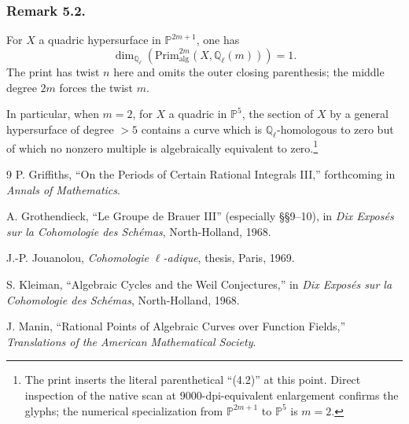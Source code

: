 \subsubsection*{Remark 5.2.}
For $X$ a quadric hypersurface in $\mathbb P^{2m+1}$, one has
\begin{equation*}
\dim_{\mathbb Q_\ell}\!\left(
  \mathrm{Prim}^{2m}_{\mathrm{alg}}(X,\mathbb Q_\ell(m))
\right)=1.
\end{equation*}
The print has twist $n$ here and omits the outer closing parenthesis; the
middle degree $2m$ forces the twist $m$.

In particular, when $m=2$, for $X$ a quadric in $\mathbb P^5$, the section
of $X$ by a general hypersurface of degree $>5$ contains a curve which is
$\mathbb Q_\ell$-homologous to zero but of which no nonzero multiple is
algebraically equivalent to zero.\footnote{The print inserts the literal
parenthetical ``(4.2)'' at this point.  Direct inspection of the native scan
at 9000-dpi-equivalent enlargement confirms the glyphs; the numerical
specialization from $\mathbb P^{2m+1}$ to $\mathbb P^5$ is $m=2$.}

\begin{thebibliography}{9}
P. Griffiths, ``On the Periods of Certain Rational Integrals III,''
forthcoming in \emph{Annals of Mathematics}.

A. Grothendieck, ``Le Groupe de Brauer III'' (especially \S\S 9--10), in
\emph{Dix Exposés sur la Cohomologie des Schémas}, North-Holland, 1968.

J.-P. Jouanolou, \emph{Cohomologie $\ell$-adique}, thesis, Paris, 1969.

S. Kleiman, ``Algebraic Cycles and the Weil Conjectures,'' in
\emph{Dix Exposés sur la Cohomologie des Schémas}, North-Holland, 1968.

J. Manin, ``Rational Points of Algebraic Curves over Function Fields,''
\emph{Translations of the American Mathematical Society}.
\end{thebibliography}
